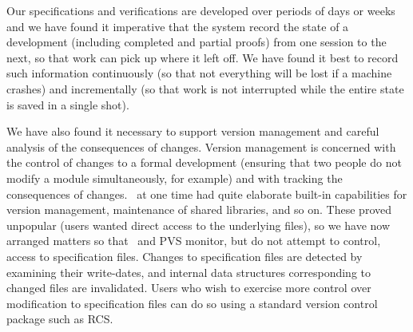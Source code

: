 Our specifications and verifications are developed over periods of
days or weeks and we have found it imperative that the system record
the state of a development (including completed and partial proofs)
from one session to the next, so that work can pick up where it left
off.  We have found it best to record such information continuously
(so that not everything will be lost if a machine crashes) and
incrementally (so that work is not interrupted while the entire state
is saved in a single shot).

We have also found it necessary to support version management and
careful analysis of the consequences of changes.  Version management
is concerned with the control of changes to a formal development
(ensuring that two people do not modify a module simultaneously, for
example) and with tracking the consequences of changes.  
\ehdm\ at one time had quite elaborate built-in capabilities for
version management, maintenance of shared libraries, and so on.  These
proved unpopular (users wanted direct access to the underlying files),
so we have now arranged matters so that \ehdm\ and PVS monitor, but do
not attempt to control, access to specification files.  Changes to
specification files are detected by examining their write-dates, and
internal data structures corresponding to changed files are
invalidated.  Users who wish to exercise more control over
modification to specification files can do so using a standard version
control package such as RCS.

